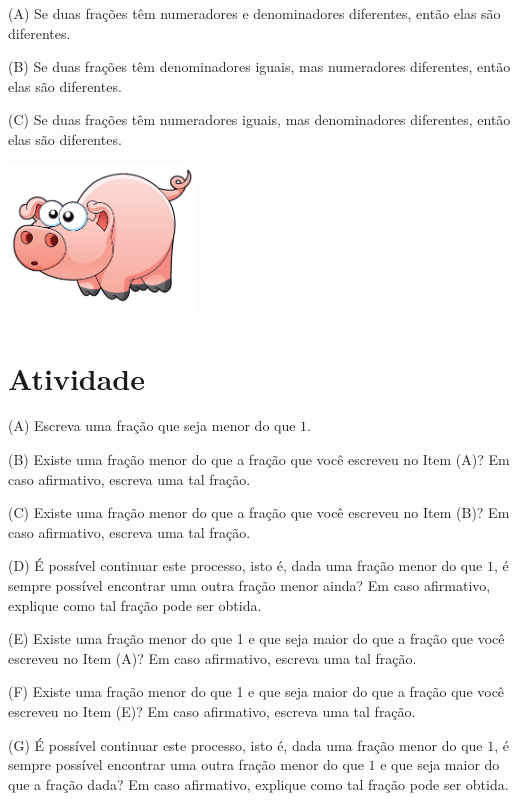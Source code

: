 \documentclass[a4,12pt]{book}
\begin{document}
(A) Se duas frações têm numeradores e denominadores diferentes, então elas são diferentes.

(B) Se duas frações têm denominadores iguais, mas numeradores diferentes, então elas são diferentes.

(C) Se duas frações têm numeradores iguais, mas denominadores diferentes, então elas são diferentes.







\includegraphics[width=\textwidth,height=4cm, keepaspectratio]{pig}
\section{Atividade}








(A) Escreva uma fração que seja menor do que $1$.

(B) Existe uma fração menor do que a fração que você escreveu no Item (A)? Em caso afirmativo, escreva uma tal fração.

(C) Existe uma fração menor do que a fração que você escreveu no Item (B)? Em caso afirmativo, escreva uma tal fração.

(D) É possível continuar este processo, isto é, dada uma fração menor do que $1$, é sempre possível encontrar uma outra fração menor ainda? Em caso afirmativo, explique como tal fração pode ser obtida.

(E) Existe uma fração menor do que 1 e que seja maior do que a fração que você escreveu no Item (A)? Em caso afirmativo, escreva uma tal fração.

(F) Existe uma fração menor do que 1 e que seja maior do que a fração que você escreveu no Item (E)? Em caso afirmativo, escreva uma tal fração.

(G) É possível continuar este processo, isto é, dada uma fração menor do que $1$, é sempre possível encontrar uma outra fração menor do que $1$ e que seja maior do que a fração dada? Em caso afirmativo, explique como tal fração pode ser obtida.
\end{document}
